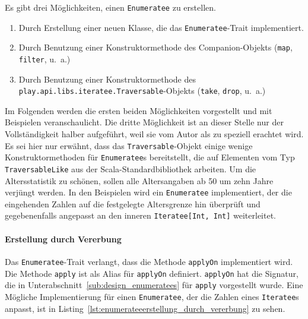 Es gibt drei Möglichkeiten, einen \lstinline|Enumeratee| zu erstellen.

\begin{enumerate}
  \item Durch Erstellung einer neuen Klasse, die das \lstinline|Enumeratee|-Trait implementiert.
  \item Durch Benutzung einer Konstruktormethode des Companion-Objekts (\lstinline|map|, \lstinline|filter|, u.~a.)
  \item Durch Benutzung einer Konstruktormethode des \lstinline|play.api.libs.iteratee.Traversable|-Objekts (\lstinline|take|, \lstinline|drop|, u.~a.)
\end{enumerate}

Im Folgenden werden die ersten beiden Möglichkeiten vorgestellt und mit Beispielen veranschaulicht.
Die dritte Möglichkeit ist an dieser Stelle nur der Vollständigkeit halber aufgeführt, weil sie vom Autor als zu speziell erachtet wird.
Es sei hier nur erwähnt, dass das \lstinline|Traversable|-Objekt einige wenige Konstruktormethoden für \lstinline|Enumeratee|s bereitstellt, die auf Elementen vom Typ \lstinline|TraversableLike| aus der Scala-Standardbibliothek arbeiten.
Um die Altersstatistik zu schönen, sollen alle Altersangaben ab 50 um zehn Jahre verjüngt werden.
In den Beispielen wird ein \lstinline|Enumeratee| implementiert, der die eingehenden Zahlen auf die festgelegte Altersgrenze hin überprüft und gegebenenfalls angepasst an den inneren \lstinline|Iteratee[Int, Int]| weiterleitet.

\paragraph{Erstellung durch Vererbung} %
\label{par:enumerateeerstellung_durch_vererbung}\mbox{} %

Das \lstinline|Enumeratee|-Trait verlangt, dass die Methode \lstinline|applyOn| implementiert wird.
Die Methode \lstinline|apply| ist als Alias für \lstinline|applyOn| definiert.
\lstinline|applyOn| hat die Signatur, die in Unterabschnitt~\ref{sub:design_enumeratees} für \lstinline|apply| vorgestellt wurde.
Eine Mögliche Implementierung für einen \lstinline|Enumeratee|, der die Zahlen eines \lstinline|Iteratee|s anpasst, ist in Listing~\ref{lst:enumerateeerstellung_durch_vererbung} zu sehen.

